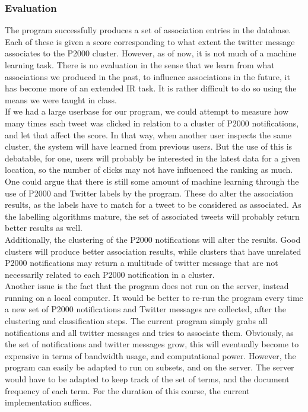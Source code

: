 \subsubsection*{Evaluation}
The program successfully produces a set of association entries in the database.
Each of these is given a score corresponding to what extent the twitter message associates to the P2000 cluster.
However, as of now, it is not much of a machine learning task.
There is no evaluation in the sense that we learn from what associations we produced in the past, to influence associations in the future, it has become more of an extended IR task.
It is rather difficult to do so using the means we were taught in class. \\
If we had a large userbase for our program, we could attempt to measure how many times each tweet was clicked in relation to a cluster of P2000 notifications, and let that affect the score.
In that way, when another user inspects the same cluster, the system will have learned from previous users.
But the use of this is debatable, for one, users will probably be interested in the latest data for a given location, so the number of clicks may not have influenced the ranking as much. \\

One could argue that there is still some amount of machine learning through the use of P2000 and Twitter labels by the program.
These do alter the association results, as the labels have to match for a tweet to be considered as associated.
As the labelling algorithms mature, the set of associated tweets will probably return better results as well. \\
Additionally, the clustering of the P2000 notifications will alter the results.
Good clusters will produce better association results, while clusters that have unrelated P2000 notifications may return a multitude of twitter message that are not necessarily related to each P2000 notification in a cluster. \\

Another issue is the fact that the program does not run on the server, instead running on a local computer.
It would be better to re-run the program every time a new set of P2000 notifications and Twitter messages are collected, after the clustering and classification steps.
The current program simply grabs all notifications and all twitter messages and tries to associate them. 
Obviously, as the set of notifications and twitter messages grow, this will eventually become to expensive in terms of bandwidth usage, and computational power.
However, the program can easily be adapted to run on subsets, and on the server.
The server would have to be adapted to keep track of the set of terms, and the document frequency of each term.
For the duration of this course, the current implementation suffices.